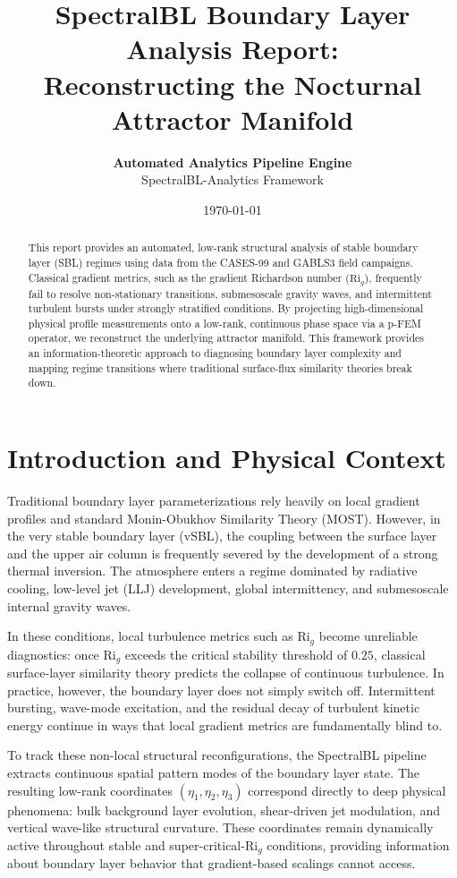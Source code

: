 \documentclass[11pt,a4paper]{article}
\title{\textbf{SpectralBL Boundary Layer Analysis Report:}\\
       \large Reconstructing the Nocturnal Attractor Manifold}
\author{\textbf{Automated Analytics Pipeline Engine}\\
        \small SpectralBL-Analytics Framework}
\date{\today}
\begin{document}
\maketitle

\begin{abstract}
This report provides an automated, low-rank structural analysis of stable boundary layer (SBL) regimes using data from the CASES-99 and GABLS3 field campaigns. Classical gradient metrics, such as the gradient Richardson number ($\mathrm{Ri}_g$), frequently fail to resolve non-stationary transitions, submesoscale gravity waves, and intermittent turbulent bursts under strongly stratified conditions. By projecting high-dimensional physical profile measurements onto a low-rank, continuous phase space via a p-FEM operator, we reconstruct the underlying attractor manifold. This framework provides an information-theoretic approach to diagnosing boundary layer complexity and mapping regime transitions where traditional surface-flux similarity theories break down.
\end{abstract}

\newpage

\section{Introduction and Physical Context}

Traditional boundary layer parameterizations rely heavily on local gradient profiles and standard Monin-Obukhov Similarity Theory (MOST). However, in the very stable boundary layer (vSBL), the coupling between the surface layer and the upper air column is frequently severed by the development of a strong thermal inversion. The atmosphere enters a regime dominated by radiative cooling, low-level jet (LLJ) development, global intermittency, and submesoscale internal gravity waves.

In these conditions, local turbulence metrics such as $\mathrm{Ri}_g$ become unreliable diagnostics: once $\mathrm{Ri}_g$ exceeds the critical stability threshold of $0.25$, classical surface-layer similarity theory predicts the collapse of continuous turbulence. In practice, however, the boundary layer does not simply switch off. Intermittent bursting, wave-mode excitation, and the residual decay of turbulent kinetic energy continue in ways that local gradient metrics are fundamentally blind to.

To track these non-local structural reconfigurations, the SpectralBL pipeline extracts continuous spatial pattern modes of the boundary layer state. The resulting low-rank coordinates $(\eta_1, \eta_2, \eta_3)$ correspond directly to deep physical phenomena: bulk background layer evolution, shear-driven jet modulation, and vertical wave-like structural curvature. These coordinates remain dynamically active throughout stable and super-critical-$\mathrm{Ri}_g$ conditions, providing information about boundary layer behavior that gradient-based scalings cannot access.
\end{document}
